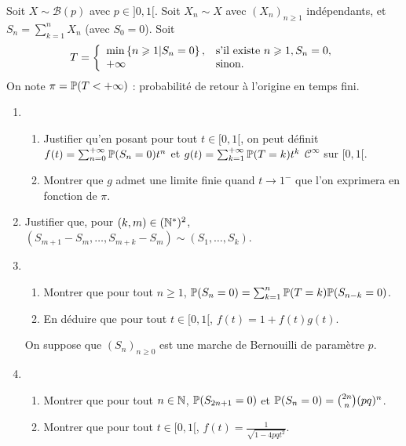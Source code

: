 \documentclass[12pt]{article}
\begin{document}
\begin{exercise}
    Soit $X\sim\mathcal{B}(p)$ avec $p\in]0,1[$. Soit $X_n\sim X$ avec $(X_n)_{n\geqslant1}$ indépendants, et $S_n=\sum_{k=1}^{n}X_n$ (avec $S_0=0$).
    Soit
    \begin{equation}
        T=
        \left\lbrace
            \begin{array}[]{ll}
                \min\left\lbrace n\geqslant1\middle| S_n=0\right\rbrace, &\text{s'il existe }n\geqslant1, S_n=0,\\
                +\infty & \text{sinon.}
            \end{array}
        \right.
    \end{equation}
    On note $\pi=\P(T<+\infty)$ : probabilité de retour à l'origine en temps fini.

    \begin{enumerate}
        \item 
        \begin{enumerate}
            \item Justifier qu'en posant pour tout $t\in[0,1[$, on peut définit $f(t)=\sum_{n=0}^{+\infty}\P(S_n=0)t^{n}$ et $g(t)=\sum_{k=1}^{+\infty}\P(T=k)t^{k}$ $\mathcal{C}^{\infty}$ sur $[0,1[$.
            \item Montrer que $g$ admet une limite finie quand $t\to 1^{-}$ que l'on exprimera en fonction de $\pi$.
        \end{enumerate}

        \item Justifier que, pour $(k,m)\in(\N^{*})^{2}$, $(S_{m+1}-S_m,\dots,S_{m+k}-S_m)\sim(S_1,\dots,S_k)$.
        
        \item 
        \begin{enumerate}
            \item Montrer que pour tout $n\geqslant1$, $\P(S_n=0)=\sum_{k=1}^{n}\P(T=k)\P(S_{n-k}=0)$.
            \item En déduire que pour tout $t\in[0,1[$, $f(t)=1+f(t)g(t)$.
        \end{enumerate}
        On suppose que $(S_n)_{n\geqslant0}$ est une marche de Bernouilli de paramètre $p$.
        \item 
        \begin{enumerate}
            \item Montrer que pour tout $n\in\N$, $\P(S_{2n+1}=0)$ et $\P(S_n=0)=\binom{2n}{n}(pq)^{n}$.
            \item Montrer que pour tout $t\in[0,1[$, $f(t)=\frac{1}{\sqrt{1-4pqt^{2}}}$.
        \end{enumerate}


\end{enumerate}
\end{exercise}
\end{document}
